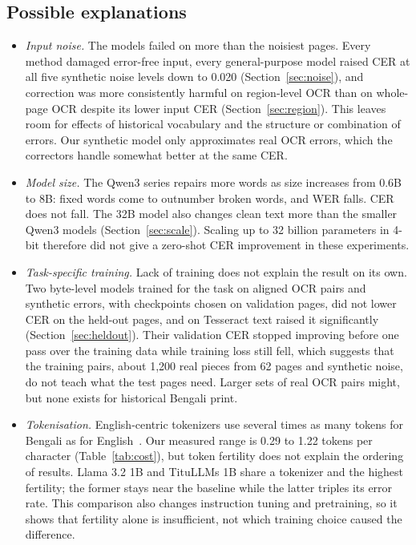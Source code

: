 \documentclass[conference]{IEEEtran}
\begin{document}
\subsection{Possible explanations}
\begin{itemize}
\item \emph{Input noise.} The models failed on more than the noisiest pages. Every method damaged error-free input, every general-purpose model raised CER at all five synthetic noise levels down to 0.020 (Section~\ref{sec:noise}), and correction was more consistently harmful on region-level OCR than on whole-page OCR despite its lower input CER (Section~\ref{sec:region}). This leaves room for effects of historical vocabulary and the structure or combination of errors. Our synthetic model only approximates real OCR errors, which the correctors handle somewhat better at the same CER.
\item \emph{Model size.} The Qwen3 series repairs more words as size increases from 0.6B to 8B: fixed words come to outnumber broken words, and WER falls. CER does not fall. The 32B model also changes clean text more than the smaller Qwen3 models (Section~\ref{sec:scale}). Scaling up to 32 billion parameters in 4-bit therefore did not give a zero-shot CER improvement in these experiments.
\item \emph{Task-specific training.} Lack of training does not explain the result on its own. Two byte-level models trained for the task on aligned OCR pairs and synthetic errors, with checkpoints chosen on validation pages, did not lower CER on the held-out pages, and on Tesseract text raised it significantly (Section~\ref{sec:heldout}). Their validation CER stopped improving before one pass over the training data while training loss still fell, which suggests that the training pairs, about 1{,}200 real pieces from 62 pages and synthetic noise, do not teach what the test pages need. Larger sets of real OCR pairs might, but none exists for historical Bengali print.
\item \emph{Tokenisation.} English-centric tokenizers use several times as many tokens for Bengali as for English~\cite{petrov2023tokenizer,ahia2023cost}. Our measured range is 0.29 to 1.22 tokens per character (Table~\ref{tab:cost}), but token fertility does not explain the ordering of results. Llama 3.2 1B and TituLLMs 1B share a tokenizer and the highest fertility; the former stays near the baseline while the latter triples its error rate. This comparison also changes instruction tuning and pretraining, so it shows that fertility alone is insufficient, not which training choice caused the difference.

\end{itemize}
\end{document}
